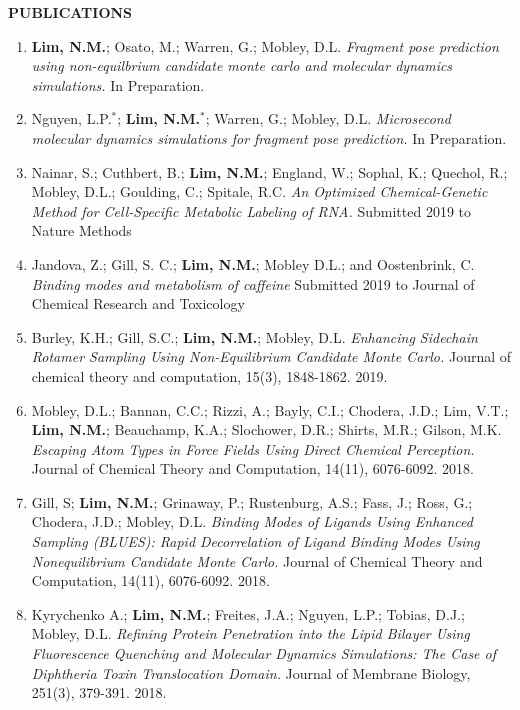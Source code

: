{\vspace{12pt}
\textbf{PUBLICATIONS}
\begin{enumerate}
    \item \textbf{Lim, N.M.}; Osato, M.; Warren, G.; Mobley, D.L.
        \textit{Fragment pose prediction using non-equilbrium candidate monte carlo and molecular dynamics simulations.}
        In Preparation.
    \item Nguyen, L.P.$^*$; \textbf{Lim, N.M.$^*$}; Warren, G.; Mobley, D.L.
        \textit{Microsecond molecular dynamics simulations for fragment pose prediction.}
        In Preparation.
    \item Nainar, S.; Cuthbert, B.; \textbf{Lim, N.M.}; England, W.; Sophal, K.; Quechol, R.; Mobley, D.L.; Goulding, C.; Spitale, R.C. 
        \textit{An Optimized Chemical-Genetic Method for Cell-Specific Metabolic Labeling of RNA.}
        Submitted 2019 to Nature Methods
    \item Jandova, Z.; Gill, S. C.; \textbf{Lim, N.M.}; Mobley D.L.; and Oostenbrink, C.
        \textit{Binding modes and metabolism of caffeine}
        Submitted 2019 to Journal of Chemical Research and Toxicology
    \item Burley, K.H.; Gill, S.C.; \textbf{Lim, N.M.}; Mobley, D.L.
        \textit{Enhancing Sidechain Rotamer Sampling Using Non-Equilibrium Candidate Monte Carlo.}
        Journal of chemical theory and computation, 15(3), 1848-1862. 2019.
    \item Mobley, D.L.; Bannan, C.C.; Rizzi, A.; Bayly, C.I.; Chodera, J.D.; Lim, V.T.; \textbf{Lim, N.M.}; Beauchamp, K.A.; Slochower, D.R.; Shirts, M.R.; Gilson, M.K.
        \textit{Escaping Atom Types in Force Fields Using Direct Chemical Perception.}
        Journal of Chemical Theory and Computation, 14(11), 6076-6092. 2018.
    \item Gill, S; \textbf{Lim, N.M.}; Grinaway, P.; Rustenburg, A.S.; Fass, J.; Ross, G.; Chodera, J.D.; Mobley, D.L.
        \textit{Binding Modes of Ligands Using Enhanced Sampling (BLUES): Rapid Decorrelation of Ligand Binding Modes Using Nonequilibrium Candidate Monte Carlo.}
        Journal of Chemical Theory and Computation, 14(11), 6076-6092. 2018.
    \item Kyrychenko A.; \textbf{Lim, N.M.}; Freites, J.A.; Nguyen, L.P.; Tobias, D.J.; Mobley, D.L.
        \textit{Refining Protein Penetration into the Lipid Bilayer Using Fluorescence Quenching and Molecular Dynamics Simulations: The Case of Diphtheria Toxin Translocation Domain.}
        Journal of Membrane Biology, 251(3), 379-391. 2018.

\end{enumerate}}
